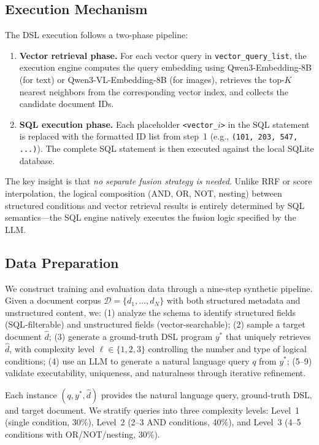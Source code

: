 \documentclass[11pt]{article}
\begin{document}
\subsection{Execution Mechanism}
\label{sec:execution}

The DSL execution follows a two-phase pipeline:

\begin{enumerate}[leftmargin=*,nosep]
\item \textbf{Vector retrieval phase.} For each vector query in \texttt{vector\_query\_list}, the execution engine computes the query embedding using Qwen3-Embedding-8B (for text) or Qwen3-VL-Embedding-8B (for images), retrieves the top-$K$ nearest neighbors from the corresponding vector index, and collects the candidate document IDs.

\item \textbf{SQL execution phase.} Each placeholder \texttt{<vector\_$i$>} in the SQL statement is replaced with the formatted ID list from step~1 (e.g., \texttt{(101, 203, 547, ...)}). The complete SQL statement is then executed against the local SQLite database.
\end{enumerate}

The key insight is that \emph{no separate fusion strategy is needed}.
Unlike RRF or score interpolation, the logical composition (AND, OR, NOT, nesting) between structured conditions and vector retrieval results is entirely determined by SQL semantics---the SQL engine natively executes the fusion logic specified by the LLM.


\subsection{Data Preparation}
\label{sec:data}

We construct training and evaluation data through a nine-step synthetic pipeline.
Given a document corpus $\mathcal{D} = \{d_1, \ldots, d_N\}$ with both structured metadata and unstructured content, we:
(1) analyze the schema to identify structured fields (SQL-filterable) and unstructured fields (vector-searchable);
(2) sample a target document $\hat{d}$;
(3) generate a ground-truth DSL program $y^*$ that uniquely retrieves $\hat{d}$, with complexity level $\ell \in \{1, 2, 3\}$ controlling the number and type of logical conditions;
(4) use an LLM to generate a natural language query $q$ from $y^*$;
(5--9) validate executability, uniqueness, and naturalness through iterative refinement.

Each instance $(q, y^*, \hat{d})$ provides the natural language query, ground-truth DSL, and target document.
We stratify queries into three complexity levels: Level~1 (single condition, 30\%), Level~2 (2--3 AND conditions, 40\%), and Level~3 (4--5 conditions with OR/NOT/nesting, 30\%).
\end{document}
